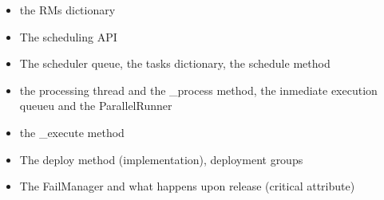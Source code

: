 %
%
%
%
%
%


\begin{itemize}
    \item the RMs dictionary
    \item The scheduling API
    \item The scheduler queue, the tasks dictionary, the schedule method 
    \item the processing thread and the \_process method, the inmediate execution queueu and the ParallelRunner
    \item the \_execute method 
    \item The deploy method (implementation), deployment groups
    \item The FailManager and what happens upon release (critical attribute)
\end{itemize}
